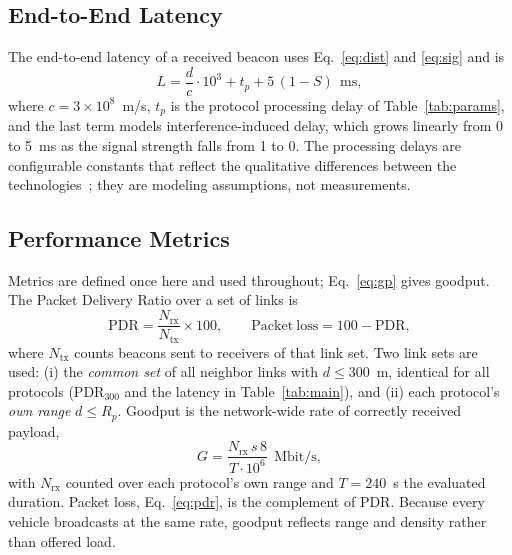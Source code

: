 \documentclass[conference]{IEEEtran}
\begin{document}
\subsection{End-to-End Latency}
The end-to-end latency of a received beacon uses Eq.~\eqref{eq:dist} and \eqref{eq:sig} and is
\begin{equation}
L=\frac{d}{c}\cdot 10^{3}+t_p+5\,(1-S)\ \ \mathrm{ms},
\label{eq:lat}
\end{equation}
where $c=3\times10^{8}$~m/s, $t_p$ is the protocol processing delay of Table~\ref{tab:params}, and the last term models interference-induced delay, which grows linearly from 0 to 5~ms as the signal strength falls from 1 to 0. The processing delays are configurable constants that reflect the qualitative differences between the technologies~\cite{3gpp36885,moradi2023,kabbur2024}; they are modeling assumptions, not measurements.

\subsection{Performance Metrics}
\label{sec:metrics}
Metrics are defined once here and used throughout; Eq.~\eqref{eq:gp} gives goodput. The Packet Delivery Ratio over a set of links is
\begin{equation}
\mathrm{PDR}=\frac{N_\mathrm{rx}}{N_\mathrm{tx}}\times 100,\qquad \mathrm{Packet\ loss}=100-\mathrm{PDR},
\label{eq:pdr}
\end{equation}
where $N_\mathrm{tx}$ counts beacons sent to receivers of that link set. Two link sets are used: (i) the \emph{common set} of all neighbor links with $d\le 300$~m, identical for all protocols (PDR$_{300}$ and the latency in Table~\ref{tab:main}), and (ii) each protocol's \emph{own range} $d\le R_p$. Goodput is the network-wide rate of correctly received payload,
\begin{equation}
G=\frac{N_\mathrm{rx}\,s\,8}{T\cdot 10^{6}}\ \ \mathrm{Mbit/s},
\label{eq:gp}
\end{equation}
with $N_\mathrm{rx}$ counted over each protocol's own range and $T=240$~s the evaluated duration. Packet loss, Eq.~\eqref{eq:pdr}, is the complement of PDR. Because every vehicle broadcasts at the same rate, goodput reflects range and density rather than offered load.
\end{document}
